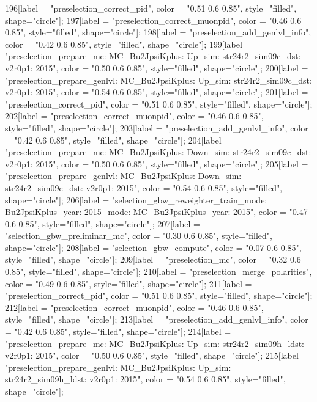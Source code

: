 {	196[label = "preselection_correct_pid", color = "0.51 0.6 0.85", style="filled", shape="circle"];
	197[label = "preselection_correct_muonpid", color = "0.46 0.6 0.85", style="filled", shape="circle"];
	198[label = "preselection_add_genlvl_info", color = "0.42 0.6 0.85", style="filled", shape="circle"];
	199[label = "preselection_prepare_mc\nmode: MC_Bu2JpsiKplus\npolarity: Up\nstrip_sim: str24r2_sim09c_dst\nversion: v2r0p1\nyear: 2015", color = "0.50 0.6 0.85", style="filled", shape="circle"];
	200[label = "preselection_prepare_genlvl\nmode: MC_Bu2JpsiKplus\npolarity: Up\nstrip_sim: str24r2_sim09c_dst\nversion: v2r0p1\nyear: 2015", color = "0.54 0.6 0.85", style="filled", shape="circle"];
	201[label = "preselection_correct_pid", color = "0.51 0.6 0.85", style="filled", shape="circle"];
	202[label = "preselection_correct_muonpid", color = "0.46 0.6 0.85", style="filled", shape="circle"];
	203[label = "preselection_add_genlvl_info", color = "0.42 0.6 0.85", style="filled", shape="circle"];
	204[label = "preselection_prepare_mc\nmode: MC_Bu2JpsiKplus\npolarity: Down\nstrip_sim: str24r2_sim09c_dst\nversion: v2r0p1\nyear: 2015", color = "0.50 0.6 0.85", style="filled", shape="circle"];
	205[label = "preselection_prepare_genlvl\nmode: MC_Bu2JpsiKplus\npolarity: Down\nstrip_sim: str24r2_sim09c_dst\nversion: v2r0p1\nyear: 2015", color = "0.54 0.6 0.85", style="filled", shape="circle"];
	206[label = "selection_gbw_reweighter_train\ndata_mode: Bu2JpsiKplus\ndata_year: 2015\nmc_mode: MC_Bu2JpsiKplus\nmc_year: 2015", color = "0.47 0.6 0.85", style="filled", shape="circle"];
	207[label = "selection_gbw_preliminar_mc", color = "0.30 0.6 0.85", style="filled", shape="circle"];
	208[label = "selection_gbw_compute", color = "0.07 0.6 0.85", style="filled", shape="circle"];
	209[label = "preselection_mc", color = "0.32 0.6 0.85", style="filled", shape="circle"];
	210[label = "preselection_merge_polarities", color = "0.49 0.6 0.85", style="filled", shape="circle"];
	211[label = "preselection_correct_pid", color = "0.51 0.6 0.85", style="filled", shape="circle"];
	212[label = "preselection_correct_muonpid", color = "0.46 0.6 0.85", style="filled", shape="circle"];
	213[label = "preselection_add_genlvl_info", color = "0.42 0.6 0.85", style="filled", shape="circle"];
	214[label = "preselection_prepare_mc\nmode: MC_Bu2JpsiKplus\npolarity: Up\nstrip_sim: str24r2_sim09h_ldst\nversion: v2r0p1\nyear: 2015", color = "0.50 0.6 0.85", style="filled", shape="circle"];
	215[label = "preselection_prepare_genlvl\nmode: MC_Bu2JpsiKplus\npolarity: Up\nstrip_sim: str24r2_sim09h_ldst\nversion: v2r0p1\nyear: 2015", color = "0.54 0.6 0.85", style="filled", shape="circle"];
}
